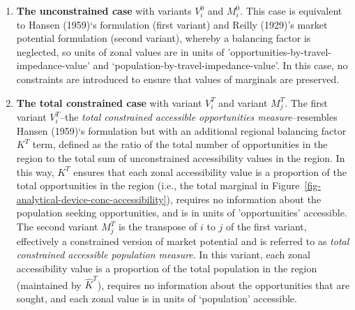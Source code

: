 \documentclass[
]{article}
\begin{document}
\begin{enumerate}
\def\labelenumi{\arabic{enumi}.}
\item
  \textbf{The unconstrained case} with variants \(V_i^0\) and \(M_i^0\).
  This case is equivalent to Hansen (1959)`s formulation (first variant)
  and Reilly (1929)'s market potential formulation (second variant),
  whereby a balancing factor is neglected, so units of zonal values are
  in units of 'opportunities-by-travel-impedance-value' and
  `population-by-travel-impedance-value'. In this case, no constraints
  are introduced to ensure that values of marginals are preserved.
\item
  \textbf{The total constrained case} with variant \(V_i^T\) and variant
  \(M_j^T\). The first variant \(V_i^T\)--the \emph{total constrained
  accessible opportunities measure}--resembles Hansen (1959)`s
  formulation but with an additional regional balancing factor \(K^T\)
  term, defined as the ratio of the total number of opportunities in the
  region to the total sum of unconstrained accessibility values in the
  region. In this way, \(K^T\) ensures that each zonal accessibility
  value is a proportion of the total opportunities in the region (i.e.,
  the total marginal in
  Figure~\ref{fig-analytical-device-conc-accessibility}), requires no
  information about the population seeking opportunities, and is in
  units of 'opportunities' accessible. The second variant \(M_j^T\) is
  the transpose of \(i\) to \(j\) of the first variant, effectively a
  constrained version of market potential and is referred to as
  \emph{total constrained accessible population measure}. In this
  variant, each zonal accessibility value is a proportion of the total
  population in the region (maintained by \(\hat K^T\)), requires no
  information about the opportunities that are sought, and each zonal
  value is in units of `population' accessible.
\end{enumerate}
\end{document}
